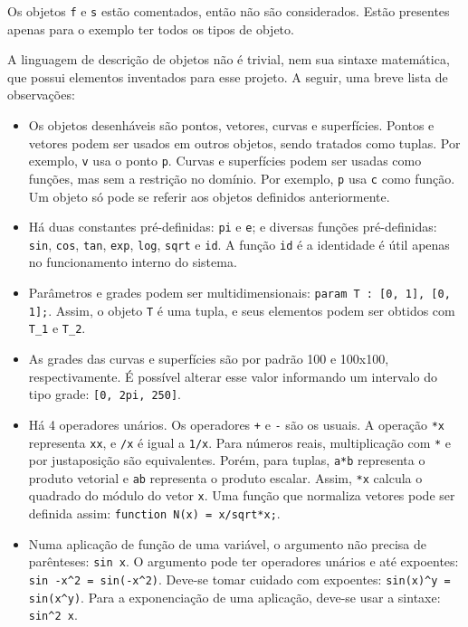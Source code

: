 Os objetos \texttt{f} e \texttt{s} estão comentados, então não são considerados.
Estão presentes apenas para o exemplo ter todos os tipos de objeto.

A linguagem de descrição de objetos não é trivial, nem sua sintaxe matemática,
que possui elementos inventados para esse projeto.
A seguir, uma breve lista de observações:

\begin{itemize}
\item
Os objetos desenháveis são pontos, vetores, curvas e superfícies.
Pontos e vetores podem ser usados em outros objetos, sendo tratados como tuplas.
Por exemplo, \texttt{v} usa o ponto \texttt{p}.
Curvas e superfícies podem ser usadas como funções, mas sem a restrição no domínio.
Por exemplo, \texttt{p} usa \texttt{c} como função.
Um objeto só pode se referir aos objetos definidos anteriormente.

\item
Há duas constantes pré-definidas: \texttt{pi} e \texttt{e}; e diversas funções pré-definidas:
\texttt{sin}, \texttt{cos}, \texttt{tan},
\texttt{exp}, \texttt{log}, \texttt{sqrt} e \texttt{id}.
A função \texttt{id} é a identidade é útil apenas no funcionamento interno do sistema.

\item
Parâmetros e grades podem ser multidimensionais:
\texttt{param T : [0, 1], [0, 1];}. Assim, o objeto \texttt{T} é uma tupla,
e seus elementos podem ser obtidos com \texttt{T\_1} e \texttt{T\_2}.

\item As grades das curvas e superfícies são por padrão 100 e 100x100, respectivamente.
É possível alterar esse valor informando um intervalo do tipo grade: \texttt{[0, 2pi, 250]}.

\item
Há 4 operadores unários. Os operadores \texttt{+} e \texttt{-} são os usuais.
A operação \texttt{*x} representa \texttt{xx}, e \texttt{/x} é igual a \texttt{1/x}.
Para números reais, multiplicação com \texttt{*} e por justaposição são equivalentes.
Porém, para tuplas, \texttt{a*b} representa o produto vetorial
e \texttt{ab} representa o produto escalar.
Assim, \texttt{*x} calcula o quadrado do módulo do vetor \texttt{x}.
Uma função que normaliza vetores pode ser definida assim: \texttt{function N(x) = x/sqrt*x;}.

\item
Numa aplicação de função de uma variável, o argumento não precisa de parênteses:
\texttt{sin x}.
O argumento pode ter operadores unários e até expoentes:
\texttt{sin -x\textasciicircum2 = sin(-x\textasciicircum2)}.
Deve-se tomar cuidado com expoentes: \texttt{sin(x)\textasciicircum y = sin(x\textasciicircum y)}.
Para a exponenciação de uma aplicação, deve-se usar a sintaxe: \texttt{sin\textasciicircum2 x}.


\end{itemize}
